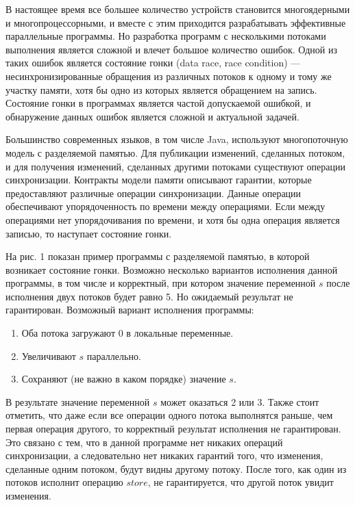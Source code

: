 \startprefacepage

В настоящее время все большее количество устройств становится многоядерными и многопроцессорными, и вместе с этим
приходится разрабатывать эффективные параллельные программы. Но разработка программ с несколькими потоками выполнения является сложной и влечет большое количество ошибок. Одной из таких ошибок является состояние гонки (data race, race condition) --- несинхронизированные обращения из различных потоков к одному и тому же участку памяти, хотя бы одно из которых является обращением на запись. Состояние гонки в программах является частой допускаемой ошибкой, и обнаружение  данных ошибок является сложной и актуальной задачей. 

Большинство современных языков, в том числе Java, используют многопоточную модель с разделяемой памятью. Для публикации изменений, сделанных потоком, и для получения изменений, сделанных другими потоками существуют операции синхронизации.
Контракты модели памяти описывают гарантии, которые предоставляют различные операции синхронизации. Данные операции обеспечивают упорядоченность по времени между операциями. Если между операциями нет упорядочивания по времени, и хотя бы одна операция является записью, то наступает состояние гонки.

На рис. 1 показан пример программы с разделяемой памятью, в которой возникает состояние гонки.
\FloatBarrier
Возможно несколько вариантов исполнения данной программы, в том числе и корректный, при котором значение переменной $s$ после исполнения двух потоков будет равно 5. Но ожидаемый результат не гарантирован. Возможный вариант исполнения программы: 
\begin{enumerate}
\item Оба потока загружают 0 в локальные переменные.
\item Увеличивают $s$ параллельно.
\item Сохраняют (не важно в каком порядке) значение $s$.
\end{enumerate}
В результате значение переменной $s$ может оказаться 2 или 3. Также стоит отметить, что даже если все операции одного потока выполнятся раньше, чем первая операция другого, то корректный результат исполнения не гарантирован. Это связано с тем, что в данной программе нет никаких операций синхронизации, а следовательно нет никаких гарантий того, что изменения, сделанные одним потоком, будут видны другому потоку. После того, как один из потоков исполнит операцию $store$, не гарантируется, что другой поток увидит изменения.



